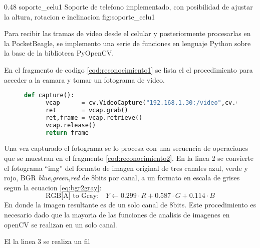 \subfiga 
      {0.48} 
      {soporte_celu1}
      {Soporte de telefono implementado, con posibilidad de ajustar la altura, rotacion e inclinacion }
      {fig:soporte_celu1}

   Para recibir las tramas de video desde el celular y posteriormente procesarlas en la PocketBeagle, se implemento una serie de funciones en lenguaje Python sobre la base de la biblioteca PyOpenCV. \par
   En el fragmento de codigo \ref{cod:reconocimiento1} se lista el el procedimiento para acceder a la camara y tomar un fotograma de video.\par

\begin{figure}[h]
   \begin{lstlisting}[language=python,caption={Conexion a la camara del telefono por Wi-Fi y captura de un fotograma para su posterior procesamiento.},label={cod:reconocimiento1}]
   def capture():
      vcap      = cv.VideoCapture("192.168.1.30:/video",cv.CAP_FFMPEG);
      ret       = vcap.grab()
      ret,frame = vcap.retrieve()
      vcap.release()
      return frame
   \end{lstlisting}
\end{figure}

Una vez capturado el fotograma se lo procesa con una secuencia de operaciones que se muestran en el fragmento \ref{cod:reconocimiento2}.
En la linea 2 se convierte el fotograma ``img'' del formato de imagen original de tres canales azul, verde y rojo, BGR \textit{blue,green,red} de 8bits por canal, a un formato en escala de grises segun la ecuacion \ref{eq:bgr2gray}:
\begin{equation}
   \text{RGB[A] to Gray:} \quad Y \leftarrow 0.299 \cdot R + 0.587 \cdot G + 0.114 \cdot B
   \label{eq:bgr2gray}
\end{equation}
En donde la imagen resultante es de un solo canal de 8bits. Este procedimiento es necesario dado que la mayoria de las funciones de analisis de imagenes en openCV se realizan en un solo canal.\par 

  El la linea 3 se realiza un fil 



